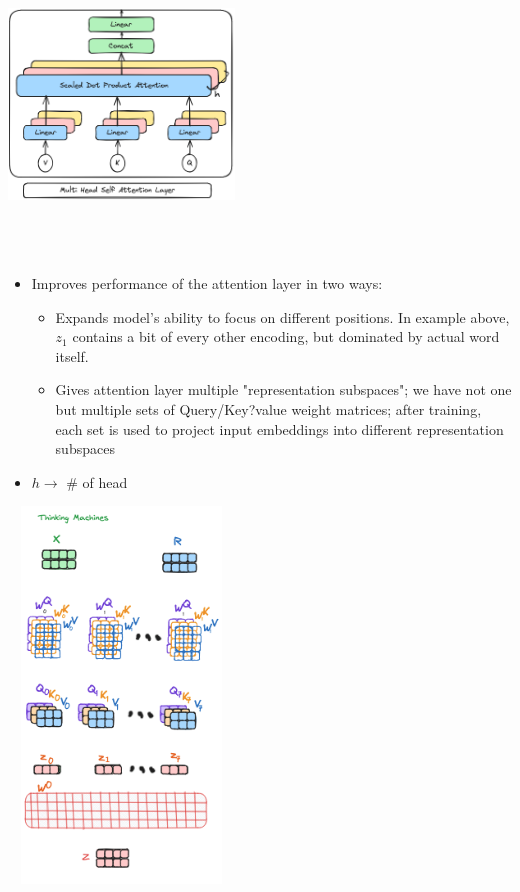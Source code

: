 \documentclass{article}
\begin{document}
\begin{minipage}{0.5\textwidth}
\includegraphics[width=6cm, height=8cm]{Transformer/Images/MultiHeadAttention1.png}
\end{minipage}
\begin{minipage}{0.5\textwidth}
\begin{itemize}
    \item Improves performance of the attention layer in two ways:
    \begin{itemize}
        \item Expands model's ability to focus on different positions. In example above, $z_1$ contains a bit of every other encoding, but dominated by actual word itself.
        \item Gives attention layer multiple "representation subspaces"; we have not one but multiple sets of Query/Key?value weight matrices; after training, each set is used to project input embeddings into different representation subspaces
    \end{itemize}
    \item $h \rightarrow $ \# of head 
\end{itemize}
\end{minipage}
\begin{minipage}{0.5\textwidth}
\includegraphics[width=6cm, height=10cm]{Transformer/Images/MultiHeadAttention2.png}
\end{minipage}
\end{document}
